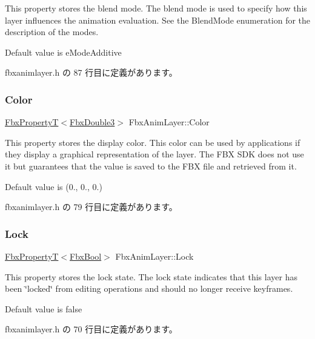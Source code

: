 This property stores the blend mode. The blend mode is used to specify how this layer influences the animation evaluation. See the Blend\+Mode enumeration for the description of the modes.

Default value is {\ttfamily e\+Mode\+Additive} 

 fbxanimlayer.\+h の 87 行目に定義があります。

\mbox{\label{class_fbx_anim_layer_a9eb1d3e6e4bcfc59122fe6261eb529bc}} 
\subsubsection{\texorpdfstring{Color}{Color}}
{\footnotesize\ttfamily \hyperlink{class_fbx_property_t}{Fbx\+PropertyT}$<$\hyperlink{fbxtypes_8h_ae0a96f14cde566774c7553aa7523b7a7}{Fbx\+Double3}$>$ Fbx\+Anim\+Layer\+::\+Color}

This property stores the display color. This color can be used by applications if they display a graphical representation of the layer. The F\+BX S\+DK does not use it but guarantees that the value is saved to the F\+BX file and retrieved from it.

Default value is {\ttfamily }(0., 0., 0.) 

 fbxanimlayer.\+h の 79 行目に定義があります。

\mbox{\label{class_fbx_anim_layer_ade773868b910bcfcedf4818b96da9233}} 
\subsubsection{\texorpdfstring{Lock}{Lock}}
{\footnotesize\ttfamily \hyperlink{class_fbx_property_t}{Fbx\+PropertyT}$<$\hyperlink{fbxtypes_8h_a92e0562b2fe33e76a242f498b362262e}{Fbx\+Bool}$>$ Fbx\+Anim\+Layer\+::\+Lock}

This property stores the lock state. The lock state indicates that this layer has been \char`\"{}locked\char`\"{} from editing operations and should no longer receive keyframes.

Default value is {\ttfamily false} 

 fbxanimlayer.\+h の 70 行目に定義があります。

